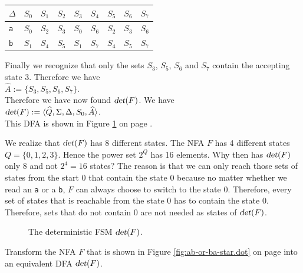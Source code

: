 \begin{center}
\begin{tabular}[t]{|l||c|c|c|c|c|c|c|c|}
\hline
$\Delta$ & $S_0$ & $S_1$ & $S_2$ & $S_3$ & $S_4$ & $S_5$ & $S_6$ & $S_7$ \\
\hline
\hline
\texttt{a} & $S_0$ & $S_2$ & $S_3$ & $S_0$ & $S_6$ & $S_2$ & $S_3$ & $S_6$ \\
\hline
\texttt{b} & $S_1$ & $S_4$ & $S_5$ & $S_1$ & $S_7$ & $S_4$ & $S_5$ & $S_7$ \\
\hline
\end{tabular}
\end{center}
Finally we recognize that only the sets  $S_3$, $S_5$, $S_6$ and $S_7$ contain the accepting state
 $3$.  Therefore we have
\\[0.2cm]
\hspace*{1.3cm}
$\widehat{A} := \{ S_3, S_5, S_6, S_7 \}$.
\\[0.2cm]
Therefore we have now found $\textsl{det}(F)$. We have
\\[0.2cm]
\hspace*{1.3cm}
$\textsl{det}(F) := \langle \widehat{Q}, \Sigma, \Delta, S_0, \widehat{A}\rangle$.
\\[0.2cm]
This \textsc{DFA} is shown in Figure \ref{fig:a2.eps} on page \pageref{fig:a2.eps}.

We realize that $\textsl{det}(F)$ has 8 different states. 
The \textsc{NFA} $F$ has 4 different states
 $Q = \{ 0, 1, 2, 3 \}$.  Hence the power set $2^Q$ has 16 elements.
Why then has  $\textsl{det}(F)$ only 8 and not $2^4 = 16$ states?
The reason is that we can only reach those sets of states from the start $0$
that contain the state $0$ because no matter whether we read an \texttt{a} or a \texttt{b},
 $F$ can always choose to switch to the state $0$.  Therefore, every set of states that is
reachable from the state $0$ has to contain the state $0$.  Therefore, 
sets that do not contain $0$ are not needed as states of $\textsl{det}(F)$.



\begin{figure}[!ht]
  \centering
     \vspace*{0.5cm}
  \caption{The deterministic \textsc{FSM} $\textsl{det}(F)$.}
  \label{fig:a2.eps}
\end{figure}


\exerciseEng
Transform the \textsc{NFA} $F$ that is shown in Figure \ref{fig:ab-or-ba-star.dot} on page
\pageref{fig:ab-or-ba-star.dot} 
into an equivalent \textsc{DFA} $\textsl{det}(F)$. \eox

